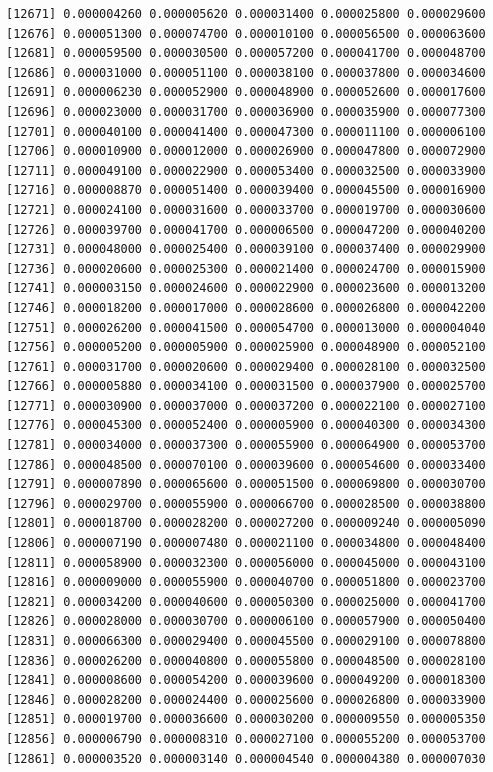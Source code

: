 \documentclass[]{article}
\begin{document}
\begin{verbatim}
[12671] 0.000004260 0.000005620 0.000031400 0.000025800 0.000029600
[12676] 0.000051300 0.000074700 0.000010100 0.000056500 0.000063600
[12681] 0.000059500 0.000030500 0.000057200 0.000041700 0.000048700
[12686] 0.000031000 0.000051100 0.000038100 0.000037800 0.000034600
[12691] 0.000006230 0.000052900 0.000048900 0.000052600 0.000017600
[12696] 0.000023000 0.000031700 0.000036900 0.000035900 0.000077300
[12701] 0.000040100 0.000041400 0.000047300 0.000011100 0.000006100
[12706] 0.000010900 0.000012000 0.000026900 0.000047800 0.000072900
[12711] 0.000049100 0.000022900 0.000053400 0.000032500 0.000033900
[12716] 0.000008870 0.000051400 0.000039400 0.000045500 0.000016900
[12721] 0.000024100 0.000031600 0.000033700 0.000019700 0.000030600
[12726] 0.000039700 0.000041700 0.000006500 0.000047200 0.000040200
[12731] 0.000048000 0.000025400 0.000039100 0.000037400 0.000029900
[12736] 0.000020600 0.000025300 0.000021400 0.000024700 0.000015900
[12741] 0.000003150 0.000024600 0.000022900 0.000023600 0.000013200
[12746] 0.000018200 0.000017000 0.000028600 0.000026800 0.000042200
[12751] 0.000026200 0.000041500 0.000054700 0.000013000 0.000004040
[12756] 0.000005200 0.000005900 0.000025900 0.000048900 0.000052100
[12761] 0.000031700 0.000020600 0.000029400 0.000028100 0.000032500
[12766] 0.000005880 0.000034100 0.000031500 0.000037900 0.000025700
[12771] 0.000030900 0.000037000 0.000037200 0.000022100 0.000027100
[12776] 0.000045300 0.000052400 0.000005900 0.000040300 0.000034300
[12781] 0.000034000 0.000037300 0.000055900 0.000064900 0.000053700
[12786] 0.000048500 0.000070100 0.000039600 0.000054600 0.000033400
[12791] 0.000007890 0.000065600 0.000051500 0.000069800 0.000030700
[12796] 0.000029700 0.000055900 0.000066700 0.000028500 0.000038800
[12801] 0.000018700 0.000028200 0.000027200 0.000009240 0.000005090
[12806] 0.000007190 0.000007480 0.000021100 0.000034800 0.000048400
[12811] 0.000058900 0.000032300 0.000056000 0.000045000 0.000043100
[12816] 0.000009000 0.000055900 0.000040700 0.000051800 0.000023700
[12821] 0.000034200 0.000040600 0.000050300 0.000025000 0.000041700
[12826] 0.000028000 0.000030700 0.000006100 0.000057900 0.000050400
[12831] 0.000066300 0.000029400 0.000045500 0.000029100 0.000078800
[12836] 0.000026200 0.000040800 0.000055800 0.000048500 0.000028100
[12841] 0.000008600 0.000054200 0.000039600 0.000049200 0.000018300
[12846] 0.000028200 0.000024400 0.000025600 0.000026800 0.000033900
[12851] 0.000019700 0.000036600 0.000030200 0.000009550 0.000005350
[12856] 0.000006790 0.000008310 0.000027100 0.000055200 0.000053700
[12861] 0.000003520 0.000003140 0.000004540 0.000004380 0.000007030

\end{verbatim}
\end{document}
